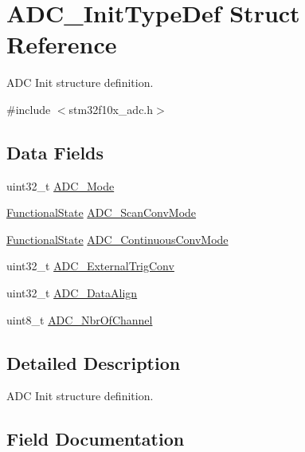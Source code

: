 \hypertarget{struct_a_d_c___init_type_def}{}\section{A\+D\+C\+\_\+\+Init\+Type\+Def Struct Reference}
\label{struct_a_d_c___init_type_def}


A\+DC Init structure definition.  




{\ttfamily \#include $<$stm32f10x\+\_\+adc.\+h$>$}

\subsection*{Data Fields}
\begin{DoxyCompactItemize}
\item 
uint32\+\_\+t \mbox{\hyperlink{struct_a_d_c___init_type_def_a7876bb5e90dfb86b6d3125f00dbc1c62}{A\+D\+C\+\_\+\+Mode}}
\item 
\mbox{\hyperlink{group___exported__types_gac9a7e9a35d2513ec15c3b537aaa4fba1}{Functional\+State}} \mbox{\hyperlink{struct_a_d_c___init_type_def_aa48a8ce21112f7262d5447bfe568e4b3}{A\+D\+C\+\_\+\+Scan\+Conv\+Mode}}
\item 
\mbox{\hyperlink{group___exported__types_gac9a7e9a35d2513ec15c3b537aaa4fba1}{Functional\+State}} \mbox{\hyperlink{struct_a_d_c___init_type_def_a3f6e0c1cc2d0e7134c1d24e3ca373074}{A\+D\+C\+\_\+\+Continuous\+Conv\+Mode}}
\item 
uint32\+\_\+t \mbox{\hyperlink{struct_a_d_c___init_type_def_a2a0142b756e9b3e30f858f4666f12c36}{A\+D\+C\+\_\+\+External\+Trig\+Conv}}
\item 
uint32\+\_\+t \mbox{\hyperlink{struct_a_d_c___init_type_def_a360ec5c7f6e5e1de535ec50dfc2c7e9b}{A\+D\+C\+\_\+\+Data\+Align}}
\item 
uint8\+\_\+t \mbox{\hyperlink{struct_a_d_c___init_type_def_a7fd8f735de53f004a901bb4caf8bb62c}{A\+D\+C\+\_\+\+Nbr\+Of\+Channel}}
\end{DoxyCompactItemize}


\subsection{Detailed Description}
A\+DC Init structure definition. 



\subsection{Field Documentation}
\mbox{\label{struct_a_d_c___init_type_def_a3f6e0c1cc2d0e7134c1d24e3ca373074}} 
